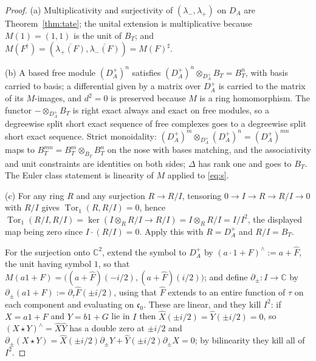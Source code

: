 \documentclass[11pt]{amsart}
\theoremstyle{definition}
\theoremstyle{remark}
\newcommand{\C}{\mathbb C}
\newcommand{\DA}{D_A}
\newcommand{\BT}{B_T}
\begin{document}
\begin{proof}
(a)  Multiplicativity and surjectivity of $(\lambda_-,\lambda_+)$ on $\DA$ are
Theorem~\ref{thm:tate}; the unital extension is multiplicative because
$M(1)=(1,1)$ is the unit of $\BT$; and
$M(F^{\dagger})=(\overline{\lambda_+(F)},\overline{\lambda_-(F)})=M(F)^{\sharp}$.

(b)  A based free module $(\DA^{+})^{n}$ satisfies
$(\DA^{+})^{n}\otimes_{\DA^{+}}\BT=\BT^{n}$, with basis carried to basis; a
differential given by a matrix over $\DA^{+}$ is carried to the matrix of its
$M$-images, and $d^{2}=0$ is preserved because $M$ is a ring homomorphism.  The
functor $-\otimes_{\DA^{+}}\BT$ is right exact always and exact on free
modules, so a degreewise split short exact sequence of free complexes goes to a
degreewise split short exact sequence.  Strict monoidality:
$(\DA^{+})^{m}\otimes_{\DA^{+}}(\DA^{+})^{n}=(\DA^{+})^{mn}$ maps to
$\BT^{mn}=\BT^{m}\otimes_{\BT}\BT^{n}$ on the nose with bases matching, and the
associativity and unit constraints are identities on both sides; $\Delta$ has
rank one and goes to $\BT$.  The Euler class statement is linearity of $M$
applied to \eqref{eq:s}.

(c)  For any ring $R$ and any surjection $R\to R/I$, tensoring
$0\to I\to R\to R/I\to0$ with $R/I$ gives
$\operatorname{Tor}_1(R,R/I)=0$, hence
$\operatorname{Tor}_1(R/I,R/I)=\ker(I\otimes_RR/I\to R/I)=I\otimes_RR/I=I/I^{2}$,
the displayed map being zero since $I\cdot(R/I)=0$.  Apply this with
$R=\DA^{+}$ and $R/I=\BT$.

For the surjection onto $\C^{2}$, extend the symbol to $\DA^{+}$ by
$(a\cdot1+F)^{\wedge}:=a+\widehat F$, the unit having symbol $1$, so that
$M(a1+F)=\bigl((a+\widehat F)(-i/2),(a+\widehat F)(i/2)\bigr)$; and define
$\partial_{\pm}:I\to\C$ by $\partial_{\pm}(a1+F):=\partial_{\tau}\widehat
F(\pm i/2)$, using that $\widehat F$ extends to an entire function of $\tau$ on
each component and evaluating on $\mathfrak c_0$.  These are linear, and they
kill $I^{2}$: if $X=a1+F$ and $Y=b1+G$ lie in $I$ then $\widehat X(\pm
i/2)=\widehat Y(\pm i/2)=0$, so $(X\star Y)^{\wedge}=\widehat X\widehat Y$ has
a double zero at $\pm i/2$ and $\partial_{\pm}(X\star Y)=\widehat X(\pm
i/2)\partial_{\pm}Y+\widehat Y(\pm i/2)\partial_{\pm}X=0$; by bilinearity they
kill all of $I^{2}$.


\end{proof}
\end{document}

